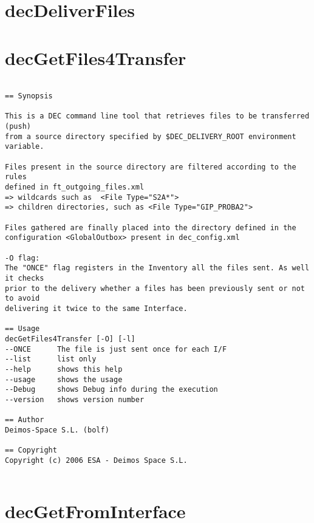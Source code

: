 \documentclass[dec_sum_main.tex]{subfiles}
\begin{document}
\section{decDeliverFiles}

\section{decGetFiles4Transfer}

\begin{verbatim}

== Synopsis

This is a DEC command line tool that retrieves files to be transferred (push)
from a source directory specified by $DEC_DELIVERY_ROOT environment variable.

Files present in the source directory are filtered according to the rules 
defined in ft_outgoing_files.xml
=> wildcards such as  <File Type="S2A*">
=> children directories, such as <File Type="GIP_PROBA2"> 

Files gathered are finally placed into the directory defined in the 
configuration <GlobalOutbox> present in dec_config.xml 

-O flag:
The "ONCE" flag registers in the Inventory all the files sent. As well it checks
prior to the delivery whether a files has been previously sent or not to avoid 
delivering it twice to the same Interface.

== Usage
decGetFiles4Transfer [-O] [-l]
--ONCE      The file is just sent once for each I/F
--list      list only
--help      shows this help
--usage     shows the usage
--Debug     shows Debug info during the execution
--version   shows version number

== Author
Deimos-Space S.L. (bolf)

== Copyright
Copyright (c) 2006 ESA - Deimos Space S.L.


\end{verbatim}

\section{decGetFromInterface}
\end{document}
